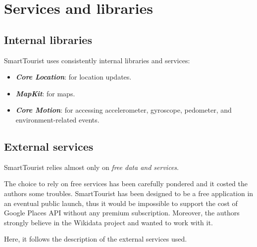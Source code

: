 \documentclass[a4paper, 11pt, parskip=half]{scrreprt}
\theoremstyle{definition}
\newenvironment{info}[1][Info:]{ %
	\medskip
	\begin{mdframed}[style=info]
		\noindent{\textbf{#1}}
}{
	\end{mdframed}
}
\begin{document}
\chapter{Services and libraries}

\section{Internal libraries}

SmartTourist uses consistently internal libraries and services:

\begin{itemize}
    \item \textbf{\textit{Core Location}}: for location updates.
	\item \textbf{\textit{MapKit}}: for maps.
	\item \textbf{\textit{Core Motion}}: for accessing accelerometer, gyroscope, pedometer, and environment-related events.
\end{itemize}

\section{External services}

SmartTourist relies almost only on \textit{free data and services}. 

\begin{info}
The choice to rely on free services has been carefully pondered and it costed the authors some troubles. SmartTourist has been designed to be a free application in an eventual public launch, thus it would be impossible to support the cost of Google Places API without any premium subscription. Moreover, the authors strongly believe in the Wikidata project and wanted to work with it.
\end{info}

Here, it follows the description of the external services used.
\end{document}

